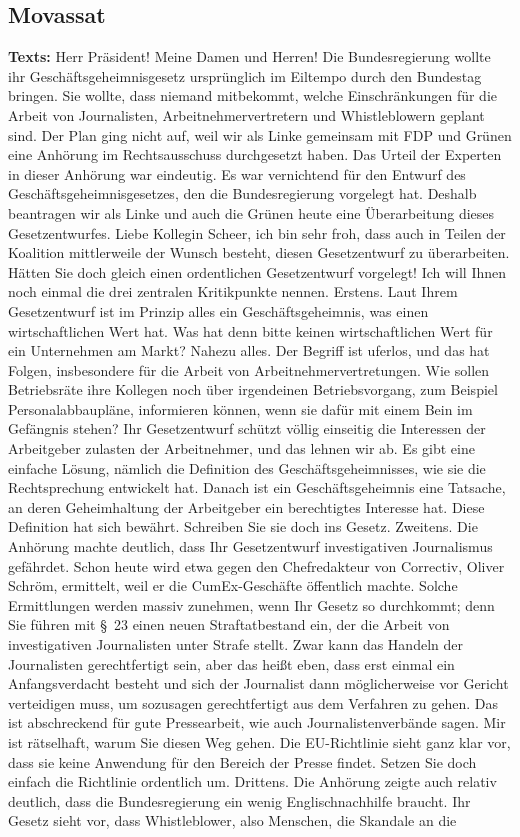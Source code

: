 \documentclass{article}
\begin{document}
\subsection{Movassat}
\noindent\textbf{Texts:} Herr Präsident! Meine Damen und Herren! Die Bundesregierung wollte ihr Geschäftsgeheimnisgesetz ursprünglich im Eiltempo durch den Bundestag bringen. Sie wollte, dass niemand mitbekommt, welche Einschränkungen für die Arbeit von Journalisten, Arbeitnehmervertretern und Whistleblowern geplant sind. Der Plan ging nicht auf, weil wir als Linke gemeinsam mit FDP und Grünen eine Anhörung im Rechtsausschuss durchgesetzt haben.  Das Urteil der Experten in dieser Anhörung war eindeutig. Es war vernichtend für den Entwurf des Geschäftsgeheimnisgesetzes, den die Bundesregierung vorgelegt hat. Deshalb beantragen wir als Linke und auch die Grünen heute eine Überarbeitung dieses Gesetzentwurfes. Liebe Kollegin Scheer, ich bin sehr froh, dass auch in Teilen der Koalition mittlerweile der Wunsch besteht, diesen Gesetzentwurf zu überarbeiten. Hätten Sie doch gleich einen ordentlichen Gesetzentwurf vorgelegt!  Ich will Ihnen noch einmal die drei zentralen Kritikpunkte nennen. Erstens. Laut Ihrem Gesetzentwurf ist im Prinzip alles ein Geschäftsgeheimnis, was einen wirtschaftlichen Wert hat. Was hat denn bitte keinen wirtschaftlichen Wert für ein Unternehmen am Markt? Nahezu alles. Der Begriff ist uferlos, und das hat Folgen, insbesondere für die Arbeit von Arbeitnehmervertretungen. Wie sollen Betriebsräte ihre Kollegen noch über irgendeinen Betriebsvorgang, zum Beispiel Personalabbaupläne, informieren können, wenn sie dafür mit einem Bein im Gefängnis stehen? Ihr Gesetzentwurf schützt völlig einseitig die Interessen der Arbeitgeber zulasten der Arbeitnehmer, und das lehnen wir ab.  Es gibt eine einfache Lösung, nämlich die Definition des Geschäftsgeheimnisses, wie sie die Rechtsprechung entwickelt hat. Danach ist ein Geschäftsgeheimnis eine Tatsache, an deren Geheimhaltung der Arbeitgeber ein berechtigtes Interesse hat. Diese Definition hat sich bewährt. Schreiben Sie sie doch ins Gesetz.  Zweitens. Die Anhörung machte deutlich, dass Ihr Gesetzentwurf investigativen Journalismus gefährdet. Schon heute wird etwa gegen den Chefredakteur von Correctiv, Oliver Schröm, ermittelt, weil er die Cum\/Ex-Geschäfte öffentlich machte. Solche Ermittlungen werden massiv zunehmen, wenn Ihr Gesetz so durchkommt; denn Sie führen mit § 23 einen neuen Straftatbestand ein, der die Arbeit von investigativen Journalisten unter Strafe stellt. Zwar kann das Handeln der Journalisten gerechtfertigt sein, aber das heißt eben, dass erst einmal ein Anfangsverdacht besteht und sich der Journalist dann möglicherweise vor Gericht verteidigen muss, um sozusagen gerechtfertigt aus dem Verfahren zu gehen. Das ist abschreckend für gute Pressearbeit, wie auch Journalistenverbände sagen. Mir ist rätselhaft, warum Sie diesen Weg gehen. Die EU-Richtlinie sieht ganz klar vor, dass sie keine Anwendung für den Bereich der Presse findet. Setzen Sie doch einfach die Richtlinie ordentlich um.  Drittens. Die Anhörung zeigte auch relativ deutlich, dass die Bundesregierung ein wenig Englischnachhilfe braucht. Ihr Gesetz sieht vor, dass Whistleblower, also Menschen, die Skandale an die 
\end{document}
